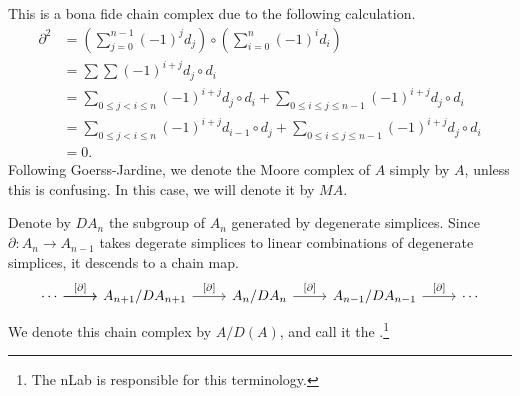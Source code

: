 \documentclass[main.tex]{subfiles}
\begin{document}
This is a bona fide chain complex due to the following calculation.
\begin{align*}
  \partial^{2} &= \left( \sum_{j = 0}^{n-1}(-1)^{j}d_{j} \right) \circ \left( \sum_{i = 0}^{n}(-1)^{i}d_{i} \right) \\
  &= \sum\sum (-1)^{i+j} d_{j} \circ d_{i} \\
  &= \sum_{0 \leq j < i \leq n} (-1)^{i+j} d_{j} \circ d_{i} + \sum_{0 \leq i \leq j \leq n-1} (-1)^{i+j} d_{j} \circ d_{i} \\
  &= \sum_{0 \leq j < i \leq n} (-1)^{i+j} d_{i-1} \circ d_{j} + \sum_{0 \leq i \leq j \leq n-1} (-1)^{i+j} d_{j} \circ d_{i} \\
  &= 0.
\end{align*}
Following Goerss-Jardine, we denote the Moore complex of $A$ simply by $A$, unless this is confusing. In this case, we will denote it by $M A$.

\begin{definition}
  \label{def:alternating_face_maps_chain_modulo_degeneracies}
  Denote by $DA_{n}$ the subgroup of $A_{n}$ generated by degenerate simplices. Since $\partial\colon A_{n} \to A_{n-1}$ takes degerate simplices to linear combinations of degenerate simplices, it descends to a chain map.
  \begin{equation*}
    \begin{tikzcd}
      \cdots
      \arrow[r, "{[\partial]}"]
      \arrow[r]
      & A_{n+1}/DA_{n+1}
      \arrow[r, "{[\partial]}"]
      & A_{n}/DA_{n}
      \arrow[r, "{[\partial]}"]
      & A_{n-1}/DA_{n-1}
      \arrow[r, "{[\partial]}"]
      & \cdots
    \end{tikzcd}
  \end{equation*}
  We denote this chain complex by $A/D(A)$, and call it the .\footnote{The nLab is responsible for this terminology.}
\end{definition}
\end{document}
